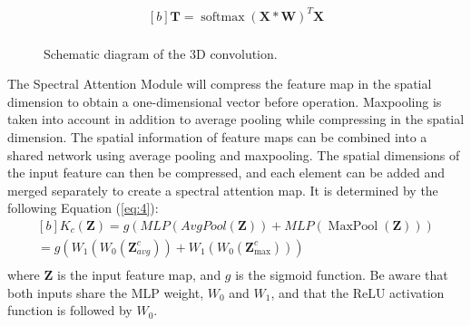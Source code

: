 \documentclass[]{interact}
\theoremstyle{plain}%
\theoremstyle{definition}
\theoremstyle{remark}
\begin{document}
\begin{equation}\label{eq:3}
\begin{aligned}[b]
\boldsymbol{T}=\operatorname{softmax}(\boldsymbol{X} * \boldsymbol{W})^T \boldsymbol{X}
\\
\end{aligned}
\end{equation}

\begin{figure}[H]
\centering
{}
\caption{Schematic diagram of the 3D convolution.}\label{fig:3}
\end{figure}

The Spectral Attention Module will compress the feature map in the spatial dimension to obtain a one-dimensional vector before operation. Maxpooling is taken into account in addition to average pooling while compressing in the spatial dimension. The spatial information of feature maps can be combined into a shared network using average pooling and maxpooling. The spatial dimensions of the input feature can then be compressed, and each element can be added and merged separately to create a spectral attention map. It is determined by the following Equation (\ref{eq:4}):
\begin{equation}\label{eq:4}
\begin{aligned}[b]
K_{c}({\boldsymbol Z})=g(M L P(A v g P o o l({\boldsymbol Z}))+M L P(\operatorname{MaxPool}({\boldsymbol Z}))) \\
=g\left(W_{1}\left(W_{0}\left({\boldsymbol Z}_{a v g}^{c}\right)\right)+W_{1}\left(W_{0}\left({\boldsymbol Z}_{\max }^{c}\right)\right)\right) \\
\end{aligned}
\end{equation}
 where $\boldsymbol Z$ is the input feature map, and $g$ is the sigmoid function. Be aware that both inputs share the MLP weight, $W_{0}$ and $W_{1}$, and that the ReLU activation function is followed by $W_{0}$.
 
\end{document}

